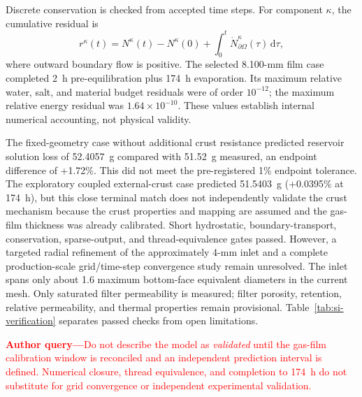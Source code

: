 \documentclass[draft,wrr]{agutexSI2019}
\newcommand{\verify}[1]{%
  \par\smallskip\noindent\textcolor{red}{\textbf{Author query---}#1}\par\smallskip}
\begin{document}
\begin{article}
Discrete conservation is checked from accepted time steps. For component
$\kappa$, the cumulative residual is
\begin{equation}
r^\kappa(t)=N^\kappa(t)-N^\kappa(0)
+\int_0^t\dot N_{\partial\Omega}^\kappa(\tau)\,\mathrm{d}\tau,
\label{eq:si-budget-residual}
\end{equation}
where outward boundary flow is positive. The selected 8.100-mm film case
completed 2~h pre-equilibration plus 174~h evaporation. Its maximum relative
water, salt, and material budget residuals were of order $10^{-12}$; the maximum
relative energy residual was $1.64\times10^{-10}$. These values establish
internal numerical accounting, not physical validity.

The fixed-geometry case without additional crust resistance predicted reservoir
solution loss of 52.4057~g compared with 51.52~g measured, an endpoint
difference of +1.72\%. This did not meet the pre-registered 1\% endpoint
tolerance. The exploratory coupled external-crust case predicted 51.5403~g
(+0.0395\% at 174~h), but this close terminal match does not independently
validate the crust mechanism because the crust properties and mapping are
assumed and the gas-film thickness was already calibrated. Short hydrostatic, boundary-transport,
conservation, sparse-output, and thread-equivalence gates passed. However, a
targeted radial refinement of the approximately 4-mm inlet and a complete
production-scale grid/time-step convergence study remain unresolved. The inlet
spans only about 1.6 maximum bottom-face equivalent diameters in the current
mesh. Only saturated filter permeability is measured; filter porosity,
retention, relative permeability, and thermal properties remain provisional.
Table~\ref{tab:si-verification} separates passed checks from open limitations.

\verify{Do not describe the model as \emph{validated} until the gas-film
calibration window is reconciled and an independent prediction interval is
defined. Numerical closure, thread equivalence, and completion to 174~h do not
substitute for grid convergence or independent experimental validation.}

\begingroup
\jdraftfalse
\normalsize

\endgroup

\end{article}
\clearpage
\end{document}
